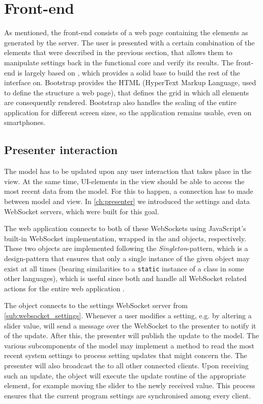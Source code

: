 \documentclass[a4paper, openany, oneside]{memoir}
\begin{document}
\section{Front-end}
\label{sec:clientside}
As mentioned, the front-end consists of a web page containing the elements as generated by the server. The user is presented with a certain combination of the elements that were described in the previous section, that allows them to manipulate settings back in the functional core and verify its results. The front-end is largely based on , which provides a solid base to build the rest of the interface on. Bootstrap provides the HTML (HyperText Markup Language, used to define the structure a web page), that defines the grid in which all elements are consequently rendered. Bootstrap also handles the scaling of the entire application for different screen sizes, so the application remains usable, even on smartphones.

\subsection{Presenter interaction}
\label{sub:presenter_interaction}
The model has to be updated upon any user interaction that takes place in the view. At the same time, UI-elements in the view should be able to access the most recent data from the model. For this to happen, a connection has to made between model and view. In \cref{ch:presenter} we introduced the settings and data WebSocket servers, which were built for this goal.

The web application connects to both of these WebSockets using JavaScript's built-in WebSocket implementation, wrapped in the  and  objects, respectively. These two objects are implemented following the \emph{Singleton}-pattern, which is a design-pattern that ensures that only a single instance of the given object may exist at all times (bearing similarities to a \texttt{static} instance of a class in some other languages), which is useful since both  and  handle all WebSocket related actions for the entire web application \cite[127]{designpatterns}.

The  object connects to the settings WebSocket server from \cref{sub:websocket_settings}. Whenever a user modifies a setting, e.g. by altering a slider value,  will send a message over the WebSocket to the presenter to notify it of the update.
After this, the presenter will publish the update to the model. The various subcomponents of the model may implement a method to read the most recent system settings to process setting updates that might concern the.
The presenter will also broadcast the to all other connected clients. Upon receiving such an update, the  object will execute the update routine of the appropriate element, for example moving the slider to the newly received value. This process ensures that the current program settings are synchronised among every client.
\end{document}
